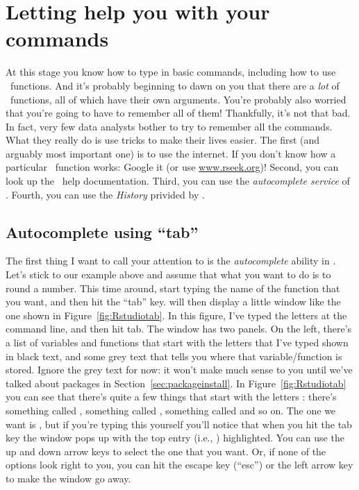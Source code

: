 

\section{Letting \Rstudio help you with your commands\label{sec:Rstudio1}}

At this stage you know how to type in basic commands, including how to use \R\ functions. And it's probably beginning to dawn on you that there are a {\it lot} of \R\ functions, all of which have their own arguments. You're probably also worried that you're going to have to remember all of them! Thankfully, it's not that bad. In fact, very few data analysts bother to try to remember all the commands. What they really do is use tricks to make their lives easier. The first (and arguably most important one) is to use the internet. If you don't know how a particular \R\ function works: Google it (or use \url{www.rseek.org})!  Second, you can look up the \R\ help documentation. Third, you can use the \textit{autocomplete service} of \Rstudio. Fourth, you can use the \textit{History} privided by \Rstudio.


\subsection{Autocomplete using ``tab''}

The first thing I  want to call your attention to is the {\it autocomplete} ability in \Rstudio.
Let's stick to our example above and assume that what you want to do is to round a number. This time around, start typing the name of the function that you want, and then hit the ``tab'' key. \Rstudio will then display a little window like the one shown in Figure~\ref{fig:Rstudiotab}. In this figure, I've typed the letters  at the command line, and then hit tab. The window has two panels. On the left, there's a list of variables and functions that start with the letters that I've typed shown in black text, and some grey text that tells you where that variable/function is stored. Ignore the grey text for now: it won't make much sense to you until we've talked about packages in Section~\ref{sec:packageinstall}. In Figure~\ref{fig:Rstudiotab} you can see that there's quite a few things that start with the letters : there's something called , something called , something called  and so on. The one we want is , but if you're typing this yourself you'll notice that when you hit the tab key the window pops up with the top entry (i.e., ) highlighted. You can use the up and down arrow keys to select the one that you want. Or, if none of the options look right to you, you can hit the escape key (``esc'') or the left arrow key to make the window go away. 

